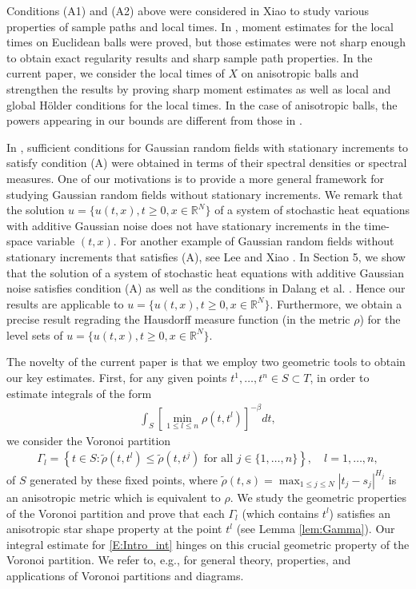 \documentclass[11pt, reqno]{amsart}
\def\R{{\mathbb R}}
\numberwithin{equation}{section}
\begin{document}
Conditions (A1) and (A2) above were considered in Xiao \cite{X09} to study various properties of sample paths 
and local times. In \cite{X09}, moment estimates for the local times on Euclidean balls were proved, but those 
estimates were not sharp enough to obtain exact regularity results and sharp sample path properties. 
In the current paper, we consider the local times of $X$ on anisotropic balls and strengthen the results by proving 
sharp moment estimates as well as  local and global H\"older conditions for the local times. In the case of 
anisotropic balls, the powers appearing in our bounds are different from those in \cite{X09, WX11,Lee22a, Lee22b}. 

In \cite{X09, LX12}, sufficient conditions for Gaussian random fields with stationary increments to satisfy condition (A) 
were obtained in terms of their spectral densities or spectral measures. One of our motivations is to provide a more
general framework for studying Gaussian random fields without stationary increments. We remark that the solution
$u= \{u(t, x), t\ge 0, x \in \R^N\}$ of a system of stochastic heat equations with additive Gaussian noise does not 
have stationary increments in the time-space variable $(t, x)$. For another example of Gaussian random fields 
without stationary increments that satisfies (A), see Lee and Xiao \cite{LeeX21}. In Section 5, we show that the solution
of a system of stochastic heat equations with additive Gaussian noise satisfies condition (A) as well as the 
conditions in Dalang et al. \cite{DMX17}.
Hence our results are  applicable to $u= \{u(t, x), t\ge 0, x \in \R^N\}$. Furthermore, we obtain a precise result 
regrading the Hausdorff measure function (in the metric $\rho$) for the level sets of  $u= \{u(t, x), t\ge 0, x \in \R^N\}$. 

The novelty of the current paper is that we employ two geometric tools to obtain our key estimates.
First, for any given points $t^1, \dots, t^n \in S \subset T$,  in order to estimate integrals of the form
\begin{align}\label{E:Intro_int}
\int_S \left[ \min_{1\le l \le n} \rho(t, t^l) \right]^{-\beta} dt,
\end{align}
 we consider the Voronoi partition
\begin{align*}
\Gamma_l = \left\{ t \in S : \tilde\rho(t, t^l) \le \tilde\rho(t, t^j) \text{ for all } j \in \{1, \dots, n\} \right\}, \quad l = 1, \dots, n,
\end{align*}
of $S$ generated by these fixed points, where $\tilde\rho(t, s) = \max_{1 \le j \le N}|t_j-s_j|^{H_j}$ is an anisotropic 
metric which is equivalent to $\rho$. We study the geometric properties of the Voronoi partition and prove that each 
$\Gamma_l$ (which contains $t^l$) satisfies an anisotropic star shape property at the point $t^l$ (see Lemma \ref{lem:Gamma}).
Our integral estimate for \eqref{E:Intro_int} hinges on this crucial geometric property of the Voronoi partition.
We refer to, e.g., \cite{K89, AKL13} for general theory, properties, and applications of Voronoi partitions and diagrams.
\end{document}
